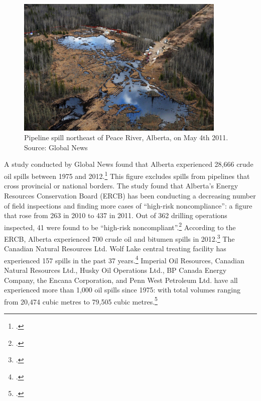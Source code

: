 \documentclass[10pt]{article}
\begin{document}
\begin{figure}[h]
\includegraphics[width=100mm]{s3-pipeline-spill.png}
\centering
\caption{Pipeline spill northeast of Peace River, Alberta, on May 4th 2011. Source: Global News}
\label{fig:s3-pipeline-spill}
\end{figure}



A study conducted by Global News found that Alberta experienced 28,666 crude oil spills between 1975 and 2012.\footcite[][]{Young37Years}
This figure excludes spills from pipelines that cross provincial or national borders.
The study found that Alberta's Energy Resources Conservation Board (ERCB) has been conducting a decreasing number of field inspections and finding more cases of ``high-risk noncompliance'': a figure that rose from 263 in 2010 to 437 in 2011.
Out of 362 drilling operations inspected, 41 were found to be ``high-risk noncompliant''.\footcite[][]{YoungPapernyRegulators}
According to the ERCB, Alberta experienced 700 crude oil and bitumen spills in 2012.\footcite[][]{YoungPapernyAnatomy}
The Canadian Natural Resources Ltd. Wolf Lake central treating facility has experienced 157 spills in the past 37 years.\footcite[][]{YoungPapernyAnatomy}
Imperial Oil Resources, Canadian Natural Resources Ltd., Husky Oil Operations Ltd., BP Canada Energy Company, the Encana Corporation, and Penn West Petroleum Ltd. have all experienced more than 1,000 oil spills since 1975: with total volumes ranging from 20,474 cubic metres to 79,505 cubic metres.\footcite[][]{YoungPapernyAnatomy}
\end{document}
